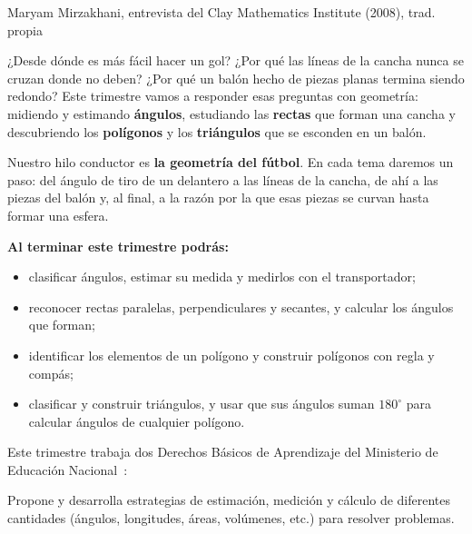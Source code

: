 \documentclass[11pt]{article}
\begin{document}
\encabezado

{Maryam Mirzakhani, entrevista del Clay Mathematics Institute (2008), trad. propia}


¿Desde dónde es más fácil hacer un gol? ¿Por qué las líneas de la cancha nunca se cruzan
donde no deben? ¿Por qué un balón hecho de piezas planas termina siendo redondo? Este
trimestre vamos a responder esas preguntas con geometría: midiendo y estimando
\textbf{ángulos}, estudiando las \textbf{rectas} que forman una cancha y descubriendo los
\textbf{polígonos} y los \textbf{triángulos} que se esconden en un balón.

Nuestro hilo conductor es \textbf{la geometría del fútbol}. En cada tema daremos un paso: del
ángulo de tiro de un delantero a las líneas de la cancha, de ahí a las piezas del balón y, al
final, a la razón por la que esas piezas se curvan hasta formar una esfera.

\textbf{Al terminar este trimestre podrás:}
\begin{itemize}
  \item clasificar ángulos, estimar su medida y medirlos con el transportador;
  \item reconocer rectas paralelas, perpendiculares y secantes, y calcular los ángulos que forman;
  \item identificar los elementos de un polígono y construir polígonos con regla y compás;
  \item clasificar y construir triángulos, y usar que sus ángulos suman $180^\circ$ para calcular
        ángulos de cualquier polígono.
\end{itemize}

Este trimestre trabaja dos Derechos Básicos de Aprendizaje del Ministerio de Educación
Nacional~\cite{mendba}:

\begin{dba}
Propone y desarrolla estrategias de estimación, medición y cálculo de diferentes cantidades
(ángulos, longitudes, áreas, volúmenes, etc.) para resolver problemas.
\end{dba}
\end{document}
